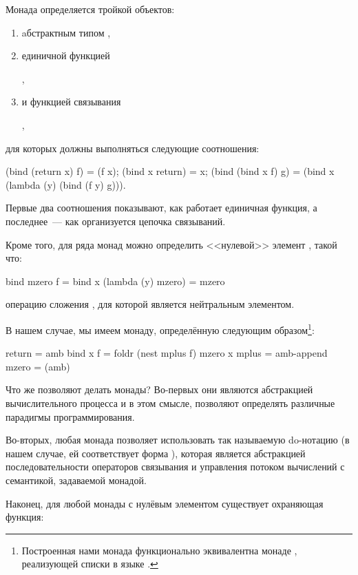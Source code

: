Монада определяется тройкой объектов:
\begin{enumerate}
  \item aбстрактным типом ,
  \item единичной функцией 
  \begin{center}
  ,
  \end{center}
  \item и функцией связывания 
  \begin{center}
  ,
  \end{center}
\end{enumerate}
для которых должны выполняться следующие соотношения:
\begin{SchemeCode}
  (bind (return x) f) = (f x);
  (bind x return) = x;
  (bind (bind x f) g) = (bind x (lambda (y) (bind (f y) g))).
\end{SchemeCode}
Первые два соотношения показывают, как работает единичная функция, а последнее~--- как организуется цепочка связываний.

Кроме того, для ряда монад можно определить <<нулевой>> элемент , такой что:

\begin{SchemeCode}
  bind mzero f = bind x (lambda (y) mzero) = mzero
\end{SchemeCode}
 операцию сложения , для которой  является нейтральным элементом.

В нашем случае, мы имеем монаду, определённую следующим образом\footnote{Построенная нами монада функционально эквивалентна монаде , реализующей списки в языке .}:

\begin{SchemeCode}
  return = amb
  bind x f = foldr (nest mplus f) mzero x
  mplus = amb-append
  mzero = (amb)
\end{SchemeCode}

Что же позволяют делать монады? Во-первых они являются абстракцией вычислительного процесса и в этом смысле, позволяют определять различные парадигмы программирования. 

Во-вторых, любая монада позволяет использовать так называемую do-нотацию (в нашем случае, ей соответствует форма ), которая является абстракцией последовательности операторов связывания и управления потоком вычислений с семантикой, задаваемой монадой.

Наконец, для любой монады с нулёвым элементом существует охраняющая функция:

